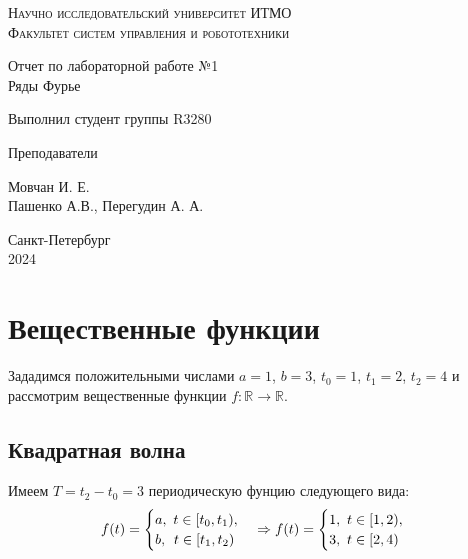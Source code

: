 \documentclass[a4paper,hidelinks,14pt]{extarticle}
\begin{document}
	\begin{titlepage}
		\setlength{\parindent}{0ex}
		
		\begin{center}
			\textsc{
				\vspace{1ex}
				Научно исследовательский университет ИТМО \\
				\vspace{0.5ex}
				Факультет систем управления и робототехники \\
				\vspace{0.5ex}
			}
		\end{center}
		
		\vspace{50mm}
		
		\begin{center}
			Отчет по лабораторной работе №1 \\
			Ряды Фурье
		\end{center}
		
		\vspace{50mm}
		
		\begin{minipage}{.55\linewidth}
			Выполнил студент группы R3280
			
			Преподаватели
		\end{minipage}
		\hfill
		\begin{minipage}{.5\linewidth}
			\begin{flushright}
				Мовчан И. Е.
				\\
				Пашенко А.В., Перегудин А. А.
			\end{flushright}
		\end{minipage}
		
		\vfill
		\begin{center}
			Санкт-Петербург
			\\
			2024
		\end{center}
		
	\end{titlepage}
	
	\section{Вещественные функции}
	Зададимся положительными числами $a=1$, $b=3$, $t_0=1$, $t_1=2$, $t_2=4$ и рассмотрим вещественные функции $f: \mathbb{R} \rightarrow \mathbb{R}$.
	\subsection{Квадратная волна}
	Имеем $T=t_2-t_0=3$ периодическую фунцию следующего вида:
	\begin{equation*}
	f(t) = \begin{cases}
		a, \ t \in [t_0, t_1), \\
		b, \ \hspace{0.5mm} t \in [t_1, t_2)
	\end{cases}
	\Rightarrow
	f(t) = \begin{cases}
		1, \ t \in [1, 2), \\
		3, \ t \in [2, 4)
	\end{cases}
	\end{equation*}
	
\end{document}
